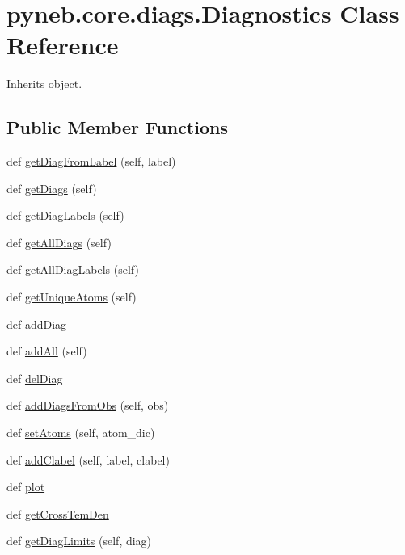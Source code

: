 \hypertarget{classpyneb_1_1core_1_1diags_1_1_diagnostics}{}\section{pyneb.\+core.\+diags.\+Diagnostics Class Reference}
\label{classpyneb_1_1core_1_1diags_1_1_diagnostics}


Inherits object.

\subsection*{Public Member Functions}
\begin{DoxyCompactItemize}
\item 
def \hyperlink{classpyneb_1_1core_1_1diags_1_1_diagnostics_acf43d1129a2fbbdcecb4bbf1389872bc}{get\+Diag\+From\+Label} (self, label)
\item 
def \hyperlink{classpyneb_1_1core_1_1diags_1_1_diagnostics_a36b89ad0fa12a9406f7ad29f22a18799}{get\+Diags} (self)
\item 
def \hyperlink{classpyneb_1_1core_1_1diags_1_1_diagnostics_a74db66bd37fcea46097e4dfad4113b41}{get\+Diag\+Labels} (self)
\item 
def \hyperlink{classpyneb_1_1core_1_1diags_1_1_diagnostics_a7113a391e6899be51eb87c9194016d43}{get\+All\+Diags} (self)
\item 
def \hyperlink{classpyneb_1_1core_1_1diags_1_1_diagnostics_a4c5666c3444b87d30e60da598d2642fd}{get\+All\+Diag\+Labels} (self)
\item 
def \hyperlink{classpyneb_1_1core_1_1diags_1_1_diagnostics_a3eeb7d0c7e4c33831c0efd8f7a74e80c}{get\+Unique\+Atoms} (self)
\item 
def \hyperlink{classpyneb_1_1core_1_1diags_1_1_diagnostics_a508fa9c5a2216f9eb4128338c33a6f75}{add\+Diag}
\item 
def \hyperlink{classpyneb_1_1core_1_1diags_1_1_diagnostics_aab98440027bccb4e851da6803f0ee398}{add\+All} (self)
\item 
def \hyperlink{classpyneb_1_1core_1_1diags_1_1_diagnostics_a64bbc36bfe0bb22570a1cb500cc395ef}{del\+Diag}
\item 
def \hyperlink{classpyneb_1_1core_1_1diags_1_1_diagnostics_a226aecfddebb567e7fe55731363635fc}{add\+Diags\+From\+Obs} (self, obs)
\item 
def \hyperlink{classpyneb_1_1core_1_1diags_1_1_diagnostics_a01ad01e336115e86eada60350060bb9b}{set\+Atoms} (self, atom\+\_\+dic)
\item 
def \hyperlink{classpyneb_1_1core_1_1diags_1_1_diagnostics_a4215075075b04c31b533a1a5c61ddd8b}{add\+Clabel} (self, label, clabel)
\item 
def \hyperlink{classpyneb_1_1core_1_1diags_1_1_diagnostics_af8b435b5fd63db75d207a7d1327ce65a}{plot}
\item 
def \hyperlink{classpyneb_1_1core_1_1diags_1_1_diagnostics_a2b0ebbaab7ce09624c1bc930e62bc228}{get\+Cross\+Tem\+Den}
\item 
def \hyperlink{classpyneb_1_1core_1_1diags_1_1_diagnostics_ab136b902dcdc56ce3372a85c1f6a7b44}{get\+Diag\+Limits} (self, diag)
\end{DoxyCompactItemize}
